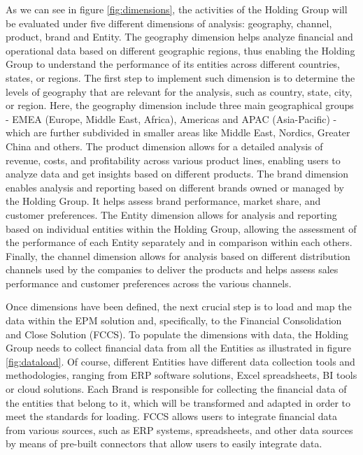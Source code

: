 \documentclass[12pt,a4paper,openright,twoside]{book}
\begin{document}
As we can see in figure \ref{fig:dimensions}, the activities of the Holding Group will be evaluated under five different dimensions of analysis: geography, channel, product, brand and Entity.
%
The geography dimension helps analyze financial and operational data based on different geographic regions, thus enabling the Holding Group to understand the performance of its entities across different countries, states, or regions. 
%
The first step to implement such dimension is to determine the levels of geography that are relevant for the analysis, such as country, state, city, or region.
%
Here, the geography dimension include three main geographical groups - EMEA (Europe, Middle East, Africa), Americas and APAC (Asia-Pacific) - which are further subdivided in smaller areas like Middle East, Nordics, Greater China and others.
%
The product dimension allows for a detailed analysis of revenue, costs, and profitability across various product lines, enabling users to analyze data and get insights based on different products.
%
The brand dimension enables analysis and reporting based on different brands owned or managed by the Holding Group. It helps assess brand performance, market share, and customer preferences.
%
The Entity dimension allows for analysis and reporting based on individual entities within the Holding Group, allowing the assessment of the performance of each Entity separately and in comparison within each others.
%
Finally, the channel dimension allows for analysis based on different distribution channels used by the companies to deliver the products and helps assess sales performance and customer preferences across the various channels. 

Once dimensions have been defined, the next crucial step is to load and map the data within the EPM solution and, specifically, to the Financial Consolidation and Close Solution (FCCS). 
%
To populate the dimensions with data, the Holding Group needs to collect financial data from all the Entities as illustrated in figure \ref{fig:dataload}.
%
Of course, different Entities have different data collection tools and methodologies, ranging from ERP software solutions, Excel spreadsheets, BI tools or cloud solutions.
%
Each Brand is responsible for collecting the financial data of the entities that belong to it, which will be transformed and adapted in order to meet the standards for loading.  
%
FCCS allows users to integrate financial data from various sources, such as ERP systems, spreadsheets, and other data sources by means of pre-built connectors that allow users to easily integrate data.
\end{document}
